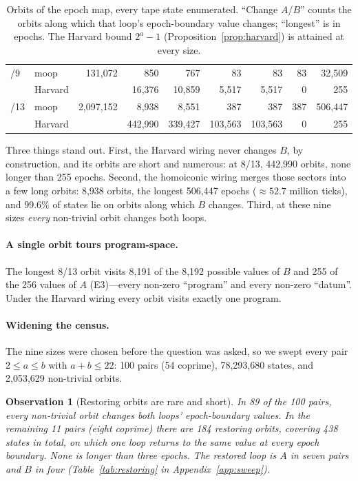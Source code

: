 \documentclass[11pt]{article}
\newtheorem{observation}[theorem]{Observation}
\theoremstyle{definition}
\theoremstyle{remark}
\newcommand{\moop}{\textsf{moop}}
\begin{document}
\begin{table}[t]
\begin{tabular}{@{}l l r r r r r r r@{}}
\addlinespace[2pt]
8/9  & \moop{}  &   131,072 &      850 &      767 &     83 &     83 &     83 &  32,509 \\
     & Harvard  &           &   16,376 &   10,859 &  5,517 &  5,517 &      0 &     255 \\
\addlinespace[2pt]
8/13 & \moop{}  & 2,097,152 &    8,938 &    8,551 &    387 &    387 &    387 & 506,447 \\
     & Harvard  &           &  442,990 &  339,427 & 103,563 & 103,563 & 0 &     255 \\
\bottomrule
\end{tabular}
\caption{Orbits of the epoch map, every tape state enumerated. ``Change
$A$/$B$'' counts the orbits along which that loop's epoch-boundary value
changes; ``longest'' is in epochs. The Harvard bound $2^a-1$
(Proposition~\ref{prop:harvard}) is attained at every size.}
\label{tab:census}
\end{table}

Three things stand out. First, the Harvard wiring never changes $B$, by
construction, and its orbits are short and numerous: at 8/13, 442,990
orbits, none longer than 255 epochs. Second, the homoiconic wiring merges
those sectors into a few long orbits: 8,938 orbits, the longest 506,447
epochs ($\approx52.7$ million ticks), and 99.6\% of states lie on orbits
along which $B$ changes. Third, at these nine sizes \emph{every}
non-trivial orbit changes both loops.

\paragraph{A single orbit tours program-space.}
The longest 8/13 orbit visits 8,191 of the 8,192 possible values of $B$
and 255 of the 256 values of $A$ (E3)---every non-zero ``program'' and
every non-zero ``datum''. Under the Harvard wiring every orbit visits
exactly one program.

\paragraph{Widening the census.}
The nine sizes were chosen before the question was asked, so we swept
every pair $2\le a\le b$ with $a+b\le22$: 100 pairs (54 coprime),
78,293,680 states, and 2,053,629 non-trivial orbits.

\begin{observation}[Restoring orbits are rare and short]
\label{obs:restoring}
In 89 of the 100 pairs, every non-trivial orbit changes both loops'
epoch-boundary values. In the remaining 11 pairs (eight coprime) there
are 184 \emph{restoring} orbits, covering 438 states in total, on which
one loop returns to the same value at every epoch boundary. None is
longer than three epochs. The restored loop is $A$ in seven pairs and $B$
in four (Table~\ref{tab:restoring} in Appendix~\ref{app:sweep}).
\end{observation}
\end{document}
